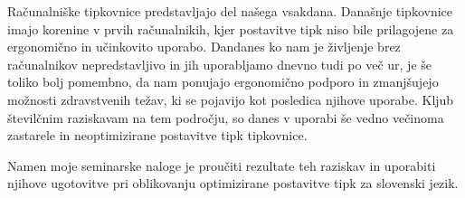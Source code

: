 

  Računalniške tipkovnice predstavljajo del našega vsakdana.
  Današnje tipkovnice imajo korenine v prvih računalnikih,
  kjer postavitve tipk niso bile prilagojene za ergonomično in učinkovito uporabo.
  Dandanes ko nam je življenje brez računalnikov nepredstavljivo in
  jih uporabljamo dnevno tudi po več ur, je še toliko bolj pomembno, da nam ponujajo ergonomično podporo
  in zmanjšujejo možnosti zdravstvenih težav, ki se pojavijo kot posledica njihove uporabe.
  Kljub številčnim raziskavam na tem področju,
  so danes v uporabi še vedno večinoma zastarele in neoptimizirane postavitve tipk tipkovnice.

  Namen moje seminarske naloge je proučiti rezultate teh raziskav in uporabiti njihove ugotovitve pri oblikovanju
  optimizirane postavitve tipk za slovenski jezik.

